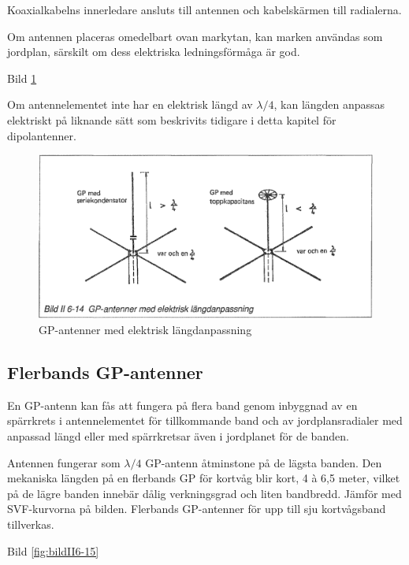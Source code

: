 Koaxialkabelns innerledare ansluts till antennen och kabelskärmen till
radialerna.

Om antennen placeras omedelbart ovan markytan, kan marken användas som
jordplan, särskilt om dess elektriska ledningsförmåga är god.

Bild \ref{fig:bildII6-14}

Om antennelementet inte har en elektrisk längd av \(\lambda/4\), kan
längden anpassas elektriskt på liknande sätt som beskrivits tidigare i
detta kapitel för dipolantenner.

\begin{figure}
  \includegraphics[width=\textwidth]{images/bild_2_6-14}
  \caption{GP-antenner med elektrisk längdanpassning}
  \label{fig:bildII6-14}
\end{figure}

\subsection{Flerbands GP-antenner}

En GP-antenn kan fås att fungera på flera band genom inbyggnad av en
spärrkrets i antennelementet för tillkommande band och av
jordplansradialer med anpassad längd eller med spärrkretsar även i
jordplanet för de banden.

Antennen fungerar som \(\lambda/4\) GP-antenn åtminstone på de lägsta
banden. Den mekaniska längden på en flerbands GP för kortvåg blir
kort, 4 à 6,5 meter, vilket på de lägre banden innebär dålig
verkningsgrad och liten bandbredd. Jämför med SVF-kurvorna på
bilden. Flerbands GP-antenner för upp till sju kortvågsband
tillverkas.

Bild \ref{fig:bildII6-15}

